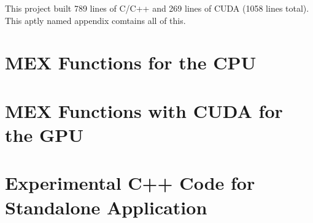 This project built 789 lines of C/C++ and 269 lines of CUDA (1058 lines total). This aptly named appendix comtains all of this.

\label{app:c_cpp_code}
\lstset{language=C++, style=C++}

\section{MEX Functions for the CPU}
\label{appC:MEX_cpu}



\section{MEX Functions with CUDA for the GPU}
\label{appC:MEX_CUDA}


\newcommand{\originalcpath}{C:/Users/cason/OneDrive/Documents/PSU/Project/03_C++/}

\section{Experimental C++ Code for Standalone Application}
\label{appC:Standalone_CPP}





